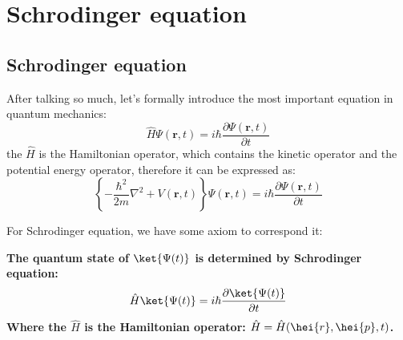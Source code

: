 %
%
%
\chapter{Schrodinger equation}
%
%
%
%


\section{Schrodinger equation}\label{SE:5}
%
%
After talking so much, let's formally introduce the most important
equation in quantum  mechanics:
\begin{equation}\label{}
\hat{H}\Psi(\bm{r},t) = i \hbar \frac{\partial
\Psi(\bm{r},t)}{\partial t}
\end{equation}
the $\hat{H}$ is the Hamiltonian operator, which contains the
kinetic operator and the potential energy operator, therefore it can
be expressed as:
\begin{equation}\label{SEeq:1}
\left\{-\frac{\hbar^{2}}{2m}\nabla^{2} +
V(\bm{r},t)\right\}\Psi(\bm{r},t) = i \hbar \frac{\partial
\Psi(\bm{r},t)}{\partial t}
\end{equation}

For Schrodinger equation, we have some axiom to correspond it:
\begin{axiom}\label{axiom6}
\textbf{The quantum state of $\ket{\Psi(t)}$ is determined by
Schrodinger equation:
\begin{equation}\label{}
\hat{H}\ket{\Psi(t)} = i \hbar \frac{\partial
\ket{\Psi(t)}}{\partial t}
\end{equation}
Where the $\hat{H}$ is the Hamiltonian operator: $\hat{H} =
\hat{H}(\hei{r}, \hei{p}, t)$. }
\end{axiom}


